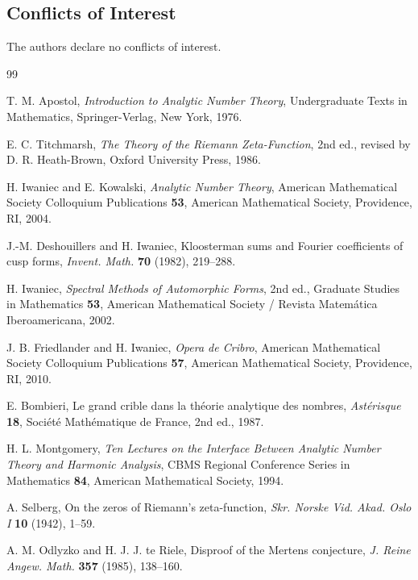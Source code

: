 \documentclass[11pt]{article}
\begin{document}
\subsection*{Conflicts of Interest}
The authors declare no conflicts of interest.

\begin{thebibliography}{99}

T. M. Apostol, \textit{Introduction to Analytic Number Theory}, Undergraduate Texts in Mathematics,
Springer-Verlag, New York, 1976.

E. C. Titchmarsh, \textit{The Theory of the Riemann Zeta-Function}, 2nd ed., revised by D. R.
Heath-Brown, Oxford University Press, 1986.

H. Iwaniec and E. Kowalski, \textit{Analytic Number Theory}, American Mathematical Society Colloquium
Publications \textbf{53}, American Mathematical Society, Providence, RI, 2004.

J.-M. Deshouillers and H. Iwaniec, Kloosterman sums and Fourier coefficients of cusp forms,
\textit{Invent. Math.} \textbf{70} (1982), 219--288.

H. Iwaniec, \textit{Spectral Methods of Automorphic Forms}, 2nd ed., Graduate Studies in Mathematics
\textbf{53}, American Mathematical Society / Revista Matem\'atica Iberoamericana, 2002.

J. B. Friedlander and H. Iwaniec, \textit{Opera de Cribro}, American Mathematical Society Colloquium
Publications \textbf{57}, American Mathematical Society, Providence, RI, 2010.

E. Bombieri, Le grand crible dans la th\'eorie analytique des nombres, \textit{Ast\'erisque} \textbf{18},
Soci\'et\'e Math\'ematique de France, 2nd ed., 1987.

H. L. Montgomery, \textit{Ten Lectures on the Interface Between Analytic Number Theory and Harmonic
Analysis}, CBMS Regional Conference Series in Mathematics \textbf{84}, American Mathematical Society,
1994.

A. Selberg, On the zeros of Riemann's zeta-function, \textit{Skr. Norske Vid. Akad. Oslo I} \textbf{10}
(1942), 1--59.

A. M. Odlyzko and H. J. J. te Riele, Disproof of the Mertens conjecture, \textit{J. Reine Angew. Math.}
\textbf{357} (1985), 138--160.


\end{thebibliography}
\end{document}
